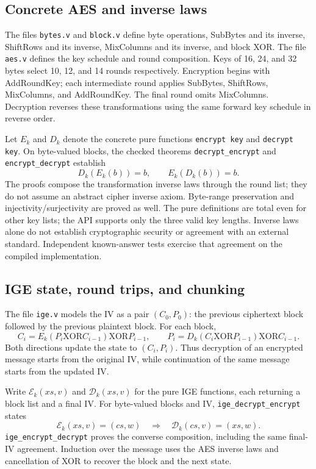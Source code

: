 \subsection{Concrete AES and inverse laws}

The files \texttt{bytes.v} and \texttt{block.v} define byte operations,
SubBytes and its inverse, ShiftRows and its inverse, MixColumns and its
inverse, and block XOR. The file \texttt{aes.v} defines the key schedule
and round composition. Keys of 16, 24, and 32 bytes select 10, 12, and 14
rounds respectively. Encryption begins with AddRoundKey; each intermediate
round applies SubBytes, ShiftRows, MixColumns, and AddRoundKey. The final
round omits MixColumns. Decryption reverses these transformations using the
same forward key schedule in reverse order.

Let \(E_k\) and \(D_k\) denote the concrete pure functions
\texttt{encrypt key} and \texttt{decrypt key}. On byte-valued blocks,
the checked theorems \texttt{decrypt\_encrypt} and
\texttt{encrypt\_decrypt} establish
\[
 D_k(E_k(b))=b,\qquad E_k(D_k(b))=b.
\]
The proofs compose the transformation inverse laws through the round list;
they do not assume an abstract cipher inverse axiom. Byte-range preservation
and injectivity/surjectivity are proved as well. The pure definitions are
total even for other key lists; the API supports only the three valid key
lengths. Inverse laws alone do not establish cryptographic security or
agreement with an external standard. Independent known-answer tests exercise
that agreement on the compiled implementation.

\subsection{IGE state, round trips, and chunking}

The file \texttt{ige.v} models the IV as a pair \((C_0,P_0)\): the previous
ciphertext block followed by the previous plaintext block. For each block,
\[
 C_i=E_k(P_i\mathbin{\mathrm{XOR}}C_{i-1})
        \mathbin{\mathrm{XOR}}P_{i-1},\qquad
 P_i=D_k(C_i\mathbin{\mathrm{XOR}}P_{i-1})
        \mathbin{\mathrm{XOR}}C_{i-1}.
\]
Both directions update the state to \((C_i,P_i)\). Thus decryption of an
encrypted message starts from the original IV, while continuation of the
same message starts from the updated IV.

Write \(\mathcal E_k(xs,v)\) and \(\mathcal D_k(xs,v)\) for the pure
IGE functions, each returning a block list and a final IV. For byte-valued
blocks and IV, \texttt{ige\_decrypt\_encrypt} states
\[
 \mathcal E_k(xs,v)=(cs,w)
 \quad\Longrightarrow\quad
 \mathcal D_k(cs,v)=(xs,w).
\]
\texttt{ige\_encrypt\_decrypt} proves the converse composition, including
the same final-IV agreement. Induction over the message uses the AES inverse
laws and cancellation of XOR to recover the block and the next state.

